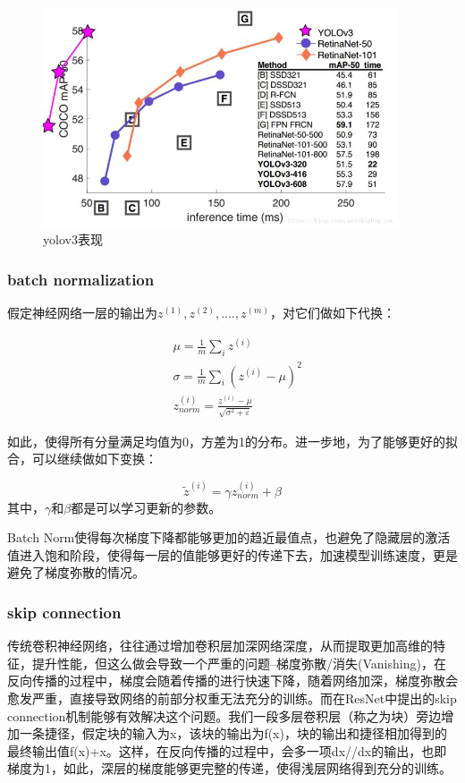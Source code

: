 \documentclass[12pt,a4paper,titlepage]{article}
\begin{document}
\begin{figure}[h]
\centering
\includegraphics[height=6.5cm]{img/yolov3.jpg}
\caption{yolov3表现}
\label{fig:yoloPerform}
\end{figure}

\subsubsection{batch normalization}
假定神经网络一层的输出为$z^{(1)}, z^{(2)}, .... , z^{(m)}$，对它们做如下代换：

\begin{align}
 &\mu = \frac{1}{m}\sum_iz^{(i)} \\
 &\sigma = \frac{1}{m}\sum_i(z^{(i)}-\mu)^2 \\
 &z^{(i)}_{norm} = \frac{z^{(i)}-\mu}{\sqrt{\sigma^2+\varepsilon}}
\end{align}

如此，使得所有分量满足均值为0，方差为1的分布。进一步地，为了能够更好的拟合，可以继续做如下变换：

\begin{equation}
\widetilde{z}^{(i)} = \gamma z_{norm}^{(i)}+\beta
\end{equation}
其中，$\gamma$和$\beta$都是可以学习更新的参数。\par
Batch Norm使得每次梯度下降都能够更加的趋近最值点，也避免了隐藏层的激活值进入饱和阶段，使得每一层的值能够更好的传递下去，加速模型训练速度，更是避免了梯度弥散的情况。

\subsubsection{skip connection}
传统卷积神经网络，往往通过增加卷积层加深网络深度，从而提取更加高维的特征，提升性能，但这么做会导致一个严重的问题--梯度弥散/消失(Vanishing)，在反向传播的过程中，梯度会随着传播的进行快速下降，随着网络加深，梯度弥散会愈发严重，直接导致网络的前部分权重无法充分的训练。而在ResNet中提出的skip connection机制能够有效解决这个问题。我们一段多层卷积层（称之为块）旁边增加一条捷径，假定块的输入为x，该块的输出为f(x)，块的输出和捷径相加得到的最终输出值f(x)+x。这样，在反向传播的过程中，会多一项dx//dx的输出，也即梯度为1，如此，深层的梯度能够更完整的传递，使得浅层网络得到充分的训练。
\end{document}
